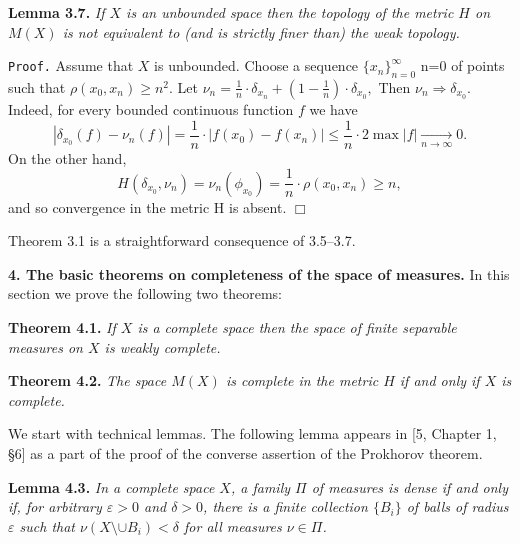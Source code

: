 \documentclass[11pt,a4paper]{article}
\begin{document}
\vspace{1em} {\bf Lemma 3.7.} \sl
 If $X$ is an unbounded space then the topology of the metric $H$ on $M(X)$ is not
equivalent to (and is strictly finer than) the weak topology. \rm
\vspace{1em} %

{\tt Proof.}
Assume that $X$ is unbounded. Choose a sequence $\{x_n\}_{n=0}^{\infty}$
n=0 of points such that $\rho(x_0,x_n)\ge n^2$.
Let
$\nu_n = \frac{1}{n}\cdot\delta_{x_n} + (1-\frac{1}{n})\cdot\delta_{x_0},$
Then $\nu_n \Rightarrow \delta_{x_0}$.
Indeed, for every bounded continuous function $f$ we have
$$|\delta_{x_0}(f)-\nu_n(f)| =
  \frac{1}{n}\cdot |f(x_0)-f(x_n)| \le
  \frac{1}{n}\cdot 2\max|f|\mathop{\longrightarrow}\limits_{n\to\infty} 0.$$
On the other hand,
$$H(\delta_{x_0},\nu_n)=\nu_n(\phi_{x_0}) = \frac{1}{n}\cdot\rho(x_0,x_n) \ge n,$$
and so convergence in the metric H is absent.
\hbox{$\Box$} \vspace{1em}

Theorem 3.1 is a straightforward consequence of 3.5--3.7.

\vspace{2em}
{\bf 4. The basic theorems on completeness of the space of measures.} %
In this section we prove the following two theorems:

\vspace{1em} {\bf Theorem 4.1.} \sl
If $X$ is a complete space then the space
of finite separable measures on $X$ is weakly complete. \rm

\vspace{1em} {\bf Theorem 4.2.} \sl
The space $M(X)$ is complete in the metric $H$
if and only if $X$ is complete. \rm
\vspace{1em} %

We start with technical lemmas. The following lemma appears in [5, Chapter 1, \S 6] as a part of the
proof of the converse assertion of the Prokhorov theorem.

\vspace{1em} {\bf Lemma 4.3.} \sl
In a complete space $X$, a family $\Pi$ of measures is dense if and only if, for arbitrary
$\varepsilon>0$ and $\delta>0$, there is
a finite collection $\{B_i\}$ of balls of radius $\varepsilon$ such that
$\nu(X\setminus \cup B_i)<\delta$ for all measures $\nu\in\Pi$. \rm
\vspace{1em} %
\end{document}
